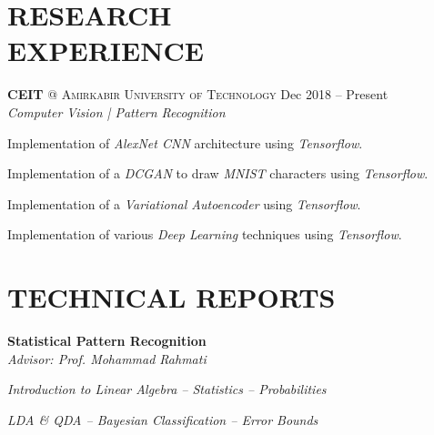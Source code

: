 \documentclass[margin, 10pt]{res} %
\begin{document}
\begin{resume}
    \section{RESEARCH \\ EXPERIENCE} 

	\textbf{CEIT} \textsc{@} \textsc{Amirkabir University of Technology}
	\hfill {Dec 2018 -- Present}\\
	\textit{Computer Vision | Pattern Recognition}
	\vspace{0.15cm}
	\begin{innerlist}
		\item Implementation of \textit{AlexNet CNN} architecture using \textit{Tensorflow}.
		
		\item Implementation of a \textit{DCGAN} to draw \textit{MNIST} characters using \textit{Tensorflow}.
		
		\item Implementation of a \textit{Variational Autoencoder} 	using \textit{Tensorflow}.
		
		\item Implementation of various \textit{Deep Learning} techniques using \textit{Tensorflow}.
		
	\end{innerlist}

     
    \section{TECHNICAL REPORTS}
        \textbf{Statistical Pattern Recognition}\\
		\textit{Advisor: Prof. Mohammad Rahmati}
		\begin{innerlist}
			\item \textit{Introduction to Linear Algebra -- Statistics -- Probabilities} \href{https://github.com/aligholamee/Patterns/raw/master/docs/assignment-1/SPR_9531504_HW1.pdf}{\hfill\UrlFont[docs]}
			
			\item \textit{LDA \& QDA -- Bayesian Classification -- Error Bounds} \href{https://github.com/aligholamee/Patterns/raw/master/docs/assignment-2/SPR_9531504_HW2.pdf}{\hfill\UrlFont[docs]}


\end{innerlist}
\end{resume}
\end{document}

